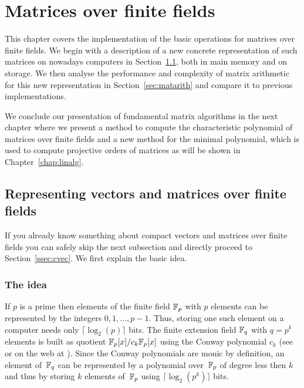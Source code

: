 
\chapter{Matrices over finite fields}
\label{chap:cmats}

This chapter covers the implementation of the basic operations for matrices 
over finite fields. We begin with a description of a new concrete 
representation of such matrices on nowadays computers in 
Section~\ref{sec:ffematrices}, both in main memory and on storage.
We then analyse the performance and complexity of matrix arithmetic 
for this new representation in Section~\ref{sec:matarith} and compare
it to previous implementations. 

We conclude our presentation of fundamental matrix algorithms
in the next chapter where we present a method to compute the characteristic
polynomial of matrices over finite fields and a new method
for the minimal polynomial, which is used to compute projective orders
of matrices as will be shown in Chapter~\ref{chap:linalg}.


\section{Representing vectors and matrices over finite fields}
\label{sec:ffematrices}

If you already know something about compact vectors and matrices over 
finite fields you can safely skip the next subsection and directly
proceed to Section~\ref{ssec:cvec}. We first explain the basic idea.

\subsection{The idea}

If $p$ is a prime then elements of the finite field $\mathbb{F}_p$ with $p$
elements can be represented by the integers $0, 1, \ldots, p-1$. Thus,
storing one such element on a computer needs only $\lceil \log_2(p)
\rceil$ bits. The finite extension field  $\mathbb{F}_q$ with $q = p^k$ elements 
is built
as quotient $\mathbb{F}_p[x]/c_k \mathbb{F}_p[x]$ using the Conway polynomial
$c_k$ (see \cite{Nickel} or on the web at \cite{ConwayFL}). Since the
Conway polynomials are monic by definition, an element
of\, $\mathbb{F}_q$ can be represented by a polynomial over\, $\mathbb{F}_p$ of degree 
less then $k$ and thus by storing $k$ elements of\, $\mathbb{F}_p$ using $\lceil
\log_2(p^k) \rceil$ bits.

